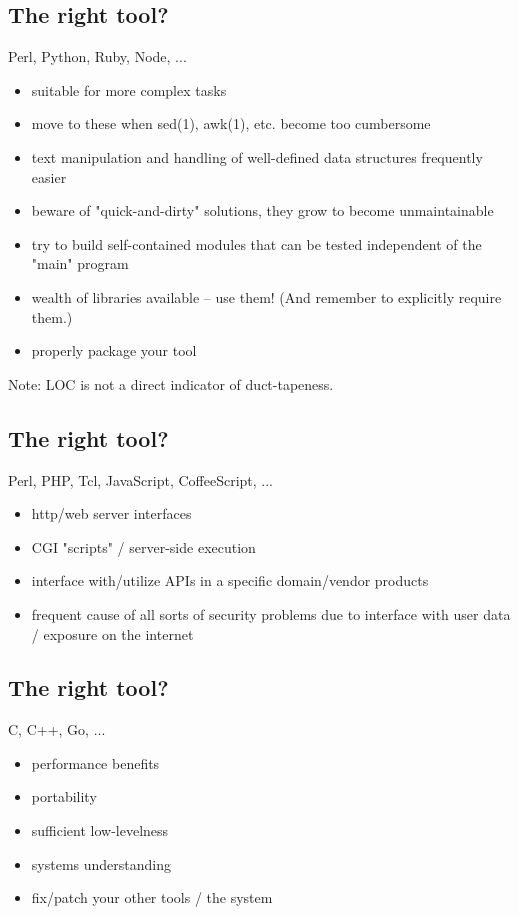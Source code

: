 \documentclass[xga]{xdvislides}
\begin{document}
\subsection{The right tool?}
Perl, Python, Ruby, Node, ... \\

\begin{itemize}
	\item suitable for more complex tasks
	\item move to these when sed(1), awk(1), etc. become too cumbersome
	\item text manipulation and handling of well-defined data structures frequently easier
	\item beware of "quick-and-dirty" solutions, they grow to become
		unmaintainable
	\item try to build self-contained modules that can be tested independent of
		the "main" program
	\item wealth of libraries available -- use them! (And remember to explicitly
		require them.)
	\item properly package your tool
\end{itemize}

Note: LOC is not a direct indicator of duct-tapeness.

\subsection{The right tool?}
Perl, PHP, Tcl, JavaScript, CoffeeScript, ... \\

\begin{itemize}
	\item http/web server interfaces
	\item CGI "scripts" / server-side execution
	\item interface with/utilize APIs in a specific domain/vendor products
	\item frequent cause of all sorts of security problems due to interface with
		user data / exposure on the internet
\end{itemize}

\subsection{The right tool?}
C, C++, Go, ... \\

\begin{itemize}
	\item performance benefits
	\item portability
	\item sufficient low-levelness
	\item systems understanding
	\item fix/patch your other tools / the system
\end{itemize}
\end{document}
